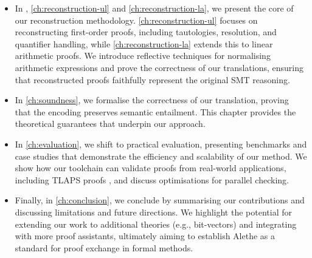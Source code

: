 \begin{itemize}
\item In , \ref{ch:reconstruction-ul} and \ref{ch:reconstruction-la}, we present the core of our reconstruction methodology.
    \cref{ch:reconstruction-ul} focuses on reconstructing first-order proofs, including tautologies, resolution, and quantifier handling, while \cref{ch:reconstruction-la} extends this to linear arithmetic proofs.
    We introduce reflective techniques for normalising arithmetic expressions and prove the correctness of our translations, ensuring that reconstructed proofs faithfully represent the original SMT reasoning.

\item In \cref{ch:soundness}, we formalise the correctness of our translation, proving that the encoding preserves semantic entailment.
    This chapter provides the theoretical guarantees that underpin our approach.

\item In \cref{ch:evaluation}, we shift to practical evaluation, presenting benchmarks and case studies that demonstrate the efficiency and scalability of our method.
    We show how our toolchain can validate proofs from real-world applications, including TLAPS proofs \cite{tla-proofs}, and discuss optimisations for parallel checking.

\item Finally, in \cref{ch:conclusion}, we conclude by summarising our contributions and discussing limitations and future directions.
    We highlight the potential for extending our work to additional theories (e.g., bit-vectors) and integrating with more proof assistants, ultimately aiming to establish Alethe as a standard for proof exchange in formal methods.
\end{itemize}

